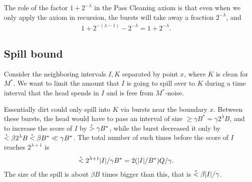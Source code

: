 \documentclass[12pt]{memoir}
\renewcommand{\le}{\leq}
\renewcommand{\ge}{\geq}
\def\B{B}
\newcommand{\Cns}[2]{#1_{\textrm{\upshape #2}}}
\newcommand{\cns}[1]{\Cns{c}{#1}}
\newcommand{\cSpace}{\cns{space}}
\newcommand{\cIncr}{\cns{incr}}
\begin{document}
The role of the factor \( 1+2^{-\lambda} \) in the Pass Cleaning axiom is that
even when we only apply the axiom in recursion, the bursts will take away
a fraction \( 2^{-\lambda} \), and
\begin{align*}
 1+2^{-(\lambda-1)}-2^{-\lambda} = 1 + 2^{-\lambda}.
 \end{align*}






\subsection{Spill bound}

Consider the neighboring intervals \( I,K \) separated by point \( x \),
where \( K \) is clean for \( M^{*} \).
We want to limit the amount that \( I \) is going to spill over to \( K \) during a time
interval that the head spends in \( I \) and is free from \( M^{*} \)-noise.

Essentially dirt could only spill into \( K \) via bursts near the boundary \( x \).
Between these bursts, the head would have to pass an interval of size 
\( \ge \gamma\B^{*} =\gamma 2^{\lambda}\B \), and to increase the score of \( I \) 
by \( \gem \gamma\B^{*} \), while the burst decreased it only by 
\( \lem \beta 2^{\lambda}\B\lem\beta\B^{*}\ll \gamma\B^{*} \).
The total number of such times before the score of \( I \) reaches \( 2^{\lambda+1} \) is
\begin{align*}
   \lem 2^{\lambda+1}|I|/\gamma\B^{*} = 2(|I|/\B^{*}) Q/\gamma.
 \end{align*}
The size of the spill is about \( \beta\B \) times bigger than this,
that is \( \stackrel{{}_*}{<} \beta |I|/\gamma \).
\end{document}
